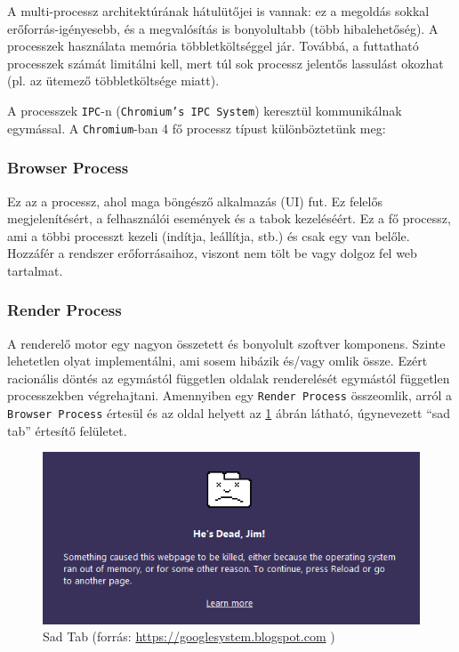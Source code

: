 \documentclass[12pt]{report}
\let\origurl\url
\renewcommand{\url}[1]{%
    \textcolor{blue}{\origurl{#1}}
}
\begin{document}
A multi-processz architektúrának hátulütőjei is vannak: ez a megoldás sokkal \\
erőforrás-igényesebb, és a megvalósítás is bonyolultabb (több hibalehetőség).
A processzek használata memória többletköltséggel jár. Továbbá, a futtatható processzek
számát limitálni kell, mert túl sok processz jelentős lassulást okozhat (pl. az ütemező
többletköltsége miatt).

A processzek \texttt{IPC}-n (\texttt{Chromium's IPC System}) keresztül kommunikálnak
egymással. A \texttt{Chromium}-ban 4 fő processz típust különböztetünk meg:

\subsubsection{Browser Process}
Ez az a processz, ahol maga böngésző alkalmazás (UI) fut. Ez felelős megjelenítésért,
a felhasználói események és a tabok kezeléséért. Ez a fő processz, ami a többi processzt
kezeli (indítja, leállítja, stb.) és csak egy van belőle. Hozzáfér a rendszer erőforrásaihoz,
viszont nem tölt be vagy dolgoz fel web tartalmat.

\subsubsection{Render Process}
A renderelő motor egy nagyon összetett és bonyolult szoftver komponens. Szinte lehetetlen
olyat implementálni, ami sosem hibázik és/vagy omlik össze. \cite{bib-chromium-multi-process}
Ezért racionális döntés az egymástól független oldalak renderelését egymástól független
processzekben végrehajtani. Amennyiben egy \texttt{Render Process} összeomlik, arról a
\texttt{Browser Process} értesül és az oldal helyett az \ref{fig-sad-tab} ábrán látható,
úgynevezett ``sad tab'' értesítő felületet.

\begin{figure}[h]
    \centering
    \includegraphics[scale=0.7]{sad_tab}
    \caption{
        \label{fig-sad-tab}
        Sad Tab (forrás: \url{https://googlesystem.blogspot.com} \cite{bib-sad-tab})
    }
\end{figure}
\end{document}
